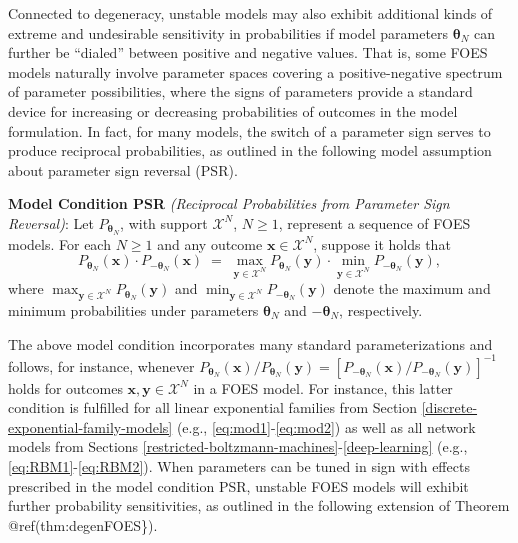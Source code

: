 \documentclass[]{article}
\theoremstyle{definition}
\begin{document}
Connected to degeneracy, unstable models may also exhibit additional
kinds of extreme and undesirable sensitivity in probabilities if model
parameters \(\boldsymbol \theta_N\) can further be ``dialed'' between
positive and negative values. That is, some FOES models naturally
involve parameter spaces covering a positive-negative spectrum of
parameter possibilities, where the signs of parameters provide a
standard device for increasing or decreasing probabilities of outcomes
in the model formulation. In fact, for many models, the switch of a
parameter sign serves to produce reciprocal probabilities, as outlined
in the following model assumption about parameter sign reversal (PSR).

\textbf{Model Condition PSR} \emph{(Reciprocal Probabilities from
Parameter Sign Reversal)}: Let \(P_{\boldsymbol \theta_N}\), with
support \(\mathcal{X}^N\), \(N\geq 1\), represent a sequence of FOES
models. For each \(N \geq 1\) and any outcome
\(\boldsymbol x \in \mathcal{X}^N\), suppose it holds that \[
P_{\boldsymbol \theta_N}(\boldsymbol x)  \cdot P_{-\boldsymbol \theta_N}(\boldsymbol x) \;=\;   \max\limits_{\boldsymbol y \in \mathcal{X}^N}P_{ \boldsymbol \theta_N}(\boldsymbol y)\cdot \min\limits_{\boldsymbol y \in \mathcal{X}^N}P_{-\boldsymbol \theta_N}(\boldsymbol y),
\] where
\(\max_{\boldsymbol y \in \mathcal{X}^N}P_{ \boldsymbol \theta_N}(\boldsymbol y)\)
and
\(\min_{\boldsymbol y \in \mathcal{X}^N}P_{-\boldsymbol \theta_N}(\boldsymbol y)\)
denote the maximum and minimum probabilities under parameters
\(\boldsymbol \theta_N\) and \(-\boldsymbol \theta_N\), respectively.

The above model condition incorporates many standard parameterizations
and follows, for instance, whenever
\(P_{\boldsymbol \theta_N}(\boldsymbol x)/P_{\boldsymbol \theta_N}(\boldsymbol y) = [P_{-\boldsymbol \theta_N}(\boldsymbol x)/P_{-\boldsymbol \theta_N}(\boldsymbol y)]^{-1}\)
holds for outcomes \(\boldsymbol x, \boldsymbol y \in\mathcal{X}^N\) in
a FOES model. For instance, this latter condition is fulfilled for all
linear exponential families from Section
\ref{discrete-exponential-family-models} (e.g.,
\eqref{eq:mod1}-\eqref{eq:mod2}) as well as all network models from Sections
\ref{restricted-boltzmann-machines}-\ref{deep-learning} (e.g.,
\eqref{eq:RBM1}-\eqref{eq:RBM2}). When parameters can be tuned in sign with
effects prescribed in the model condition PSR, unstable FOES models will
exhibit further probability sensitivities, as outlined in the following
extension of Theorem @ref(thm:degenFOES\}).
\end{document}
